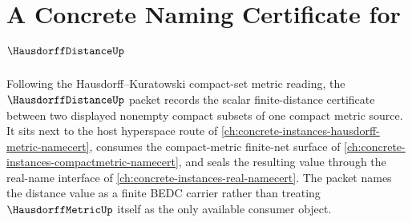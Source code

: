 \chapter{A Concrete Naming Certificate for $\HausdorffDistanceUp$}
\label{ch:concrete-instances-hausdorff-distance-namecert}

Following the Hausdorff--Kuratowski compact-set metric reading, the $\HausdorffDistanceUp$ packet records the scalar finite-distance certificate between two displayed nonempty compact subsets of one compact metric source. It sits next to the host hyperspace route of \autoref{ch:concrete-instances-hausdorff-metric-namecert}, consumes the compact-metric finite-net surface of \autoref{ch:concrete-instances-compactmetric-namecert}, and seals the resulting value through the real-name interface of \autoref{ch:concrete-instances-real-namecert}. The packet names the distance value as a finite BEDC carrier rather than treating $\HausdorffMetricUp$ itself as the only available consumer object.

